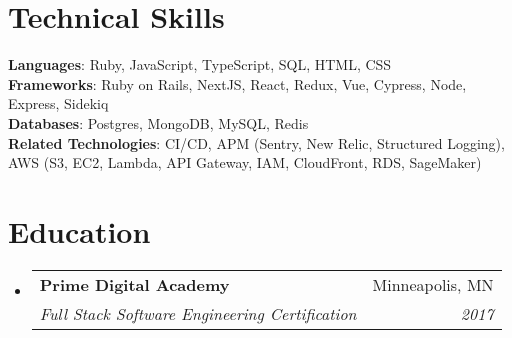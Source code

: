 \documentclass[letterpaper,11pt]{article}
\makeatletter
\newcommand{\resumeSubheading}[4]{
  \vspace{-2pt}\item
    \begin{tabular*}{0.97\textwidth}[t]{l@{\extracolsep{\fill}}r}
      \textbf{#1} & #2 \\
      \textit{\small#3} & \textit{\small #4} \\
    \end{tabular*}\vspace{-7pt}
}
\newcommand{\resumeSubHeadingListStart}{\begin{itemize}[leftmargin=0.15in, label={}]}
\newcommand{\resumeSubHeadingListEnd}{\end{itemize}}
\makeatother
\begin{document}
\section{Technical Skills}
 \begin{itemize}[leftmargin=0.15in, label={}]
    \small{\item{
     \textbf{Languages}{: Ruby, JavaScript, TypeScript, SQL, HTML, CSS} \\
     \textbf{Frameworks}{: Ruby on Rails, NextJS, React, Redux, Vue, Cypress, Node, Express, Sidekiq} \\
     \textbf{Databases}{: Postgres, MongoDB, MySQL, Redis} \\
     \textbf{Related Technologies}{: CI/CD, APM (Sentry, New Relic, Structured Logging), AWS (S3, EC2, Lambda, API Gateway, IAM, CloudFront, RDS, SageMaker)}
    }}
 \end{itemize}


\section{Education}
  \resumeSubHeadingListStart
    \resumeSubheading
      {Prime Digital Academy}{Minneapolis, MN}
      {Full Stack Software Engineering Certification}{2017}
  \resumeSubHeadingListEnd


\end{document}
